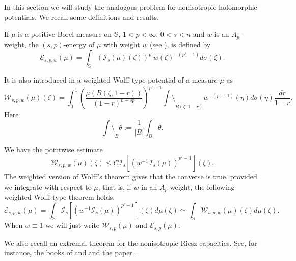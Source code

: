 \documentclass[12pt,twoside,leqno,final]{amsart}
\theoremstyle{plain}
\begin{document}
In this section we will study the analogous problem for nonisotropic holomorphic potentials. 
We recall some definitions and results. 
 
 
 
 
 
If $\mu$ is a positive Borel measure on ${{\mathbb S}}$,   $1<p<\infty$, $0<s<n$ and $w$ is an $A_p$-weight, the $(s,p)$-energy of $\mu$ with weight $w$ (see \cite{adams}), is defined by
 \begin{equation}\label{weightedenergy}
 {\mathcal E}_{s,p,w}(\mu)=\int_{{\mathbb S}} (\mathcal{I}_s(\mu)(\zeta))^{p'}w(\zeta)^{-(p'-1)}d\sigma(\zeta).
 \end{equation} 

 It is also introduced in \cite{adams} a weighted Wolff-type potential of a measure $\mu$ as
 \begin{equation}\label{weightedwolffpotential}
 {\mathcal W}_{s,p,w}(\mu)(\zeta)= \int_0^1\left( \frac{\mu(B(\zeta,1-r))}{(1-r)^{n- sp}}\right)^{p'-1} {\int\!\!\!\!\!\setminus}_{B(\zeta, 1-r)}w^{-(p'-1)}(\eta)d\sigma(\eta)\frac{dr}{1-r}.
 \end{equation}
 Here
 $${\int\!\!\!\!\!\setminus}_{B } \theta:= \frac1{|B |}\int_{B}\theta.$$
 
 We have the pointwise estimate 
 \begin{equation}\label{eqn:realpot}{\mathcal W}_{s,p,w}(\mu)(\zeta)\leq C\mathcal{I}_s[(w^{-1}  \mathcal{I}_s(\mu))^{p'-1}](\zeta).\end{equation} The weighted version of Wolff's theorem gives that the converse is true, provided we integrate with respect to $\mu$, that is,
  if $w$ in an $A_p$-weight, the following weighted Wolff-type theorem holds:
 \begin{equation}\label{weightedwolfftheorem}
 {\mathcal E}_{s,p,w}(\mu)= \int_{{\mathbb S}}\mathcal{I}_s[(w^{-1}  \mathcal{I}_s(\mu))^{p'-1}] (\zeta) d\mu(\zeta)\simeq \int_{{\mathbb S}} {\mathcal W}_{s,p,w}(\mu)(\zeta) d\mu(\zeta).
 \end{equation} 
  When $w\equiv1$ we will just write ${\mathcal W}_{s,p}(\mu)$ and ${\mathcal E}_{s,p}(\mu)$.

We also recall an extremal theorem for the nonisotropic Riesz capacities. See, for instance, the books of \cite{adamshedberg} and \cite{mazyashaposnikova} and the paper \cite{hedbergwolff}.
\end{document}
